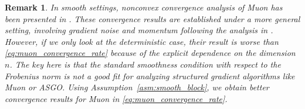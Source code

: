 \documentclass{article}
\newtheorem{remark}{Remark}
\theoremstyle{remark}
\begin{document}
\begin{remark}
    In smooth settings, nonconvex convergence analysis of Muon has been presented in \citet{li2025note}. 
    These convergence results are established under a more general setting, involving gradient noise and momentum following the analysis in \citet{cutkosky2020momentum}. However, if we only look at the deterministic case, their result is worse than \eqref{eq:muon_convergence_rate} because of the explicit dependence on the dimension $n$. The key here is that the standard smoothness condition with respect to the Frobenius norm is not a good fit for analyzing structured gradient algorithms like Muon or ASGO. Using Assumption~\ref{asm:smooth_block}, we obtain better convergence results for Muon in \eqref{eq:muon_convergence_rate}.
\end{remark}
\end{document}
